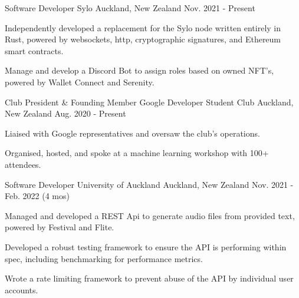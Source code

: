
\begin{cventries}

  \cventry
    {Software Developer} %
    {Sylo} %
    {Auckland, New Zealand} %
    {Nov. 2021 - Present} %
    {
      \begin{cvitems} %
        \item {Independently developed a replacement for the Sylo node written entirely in Rust, powered by websockets, http, cryptographic signatures, and Ethereum smart contracts.}
        \item {Manage and develop a Discord Bot to assign roles based on owned NFT's, powered by Wallet Connect and Serenity.}
      \end{cvitems}
    }

  \cventry
    {Club President \& Founding Member} %
    {Google Developer Student Club} %
    {Auckland, New Zealand} %
    {Aug. 2020 - Present} %
    {
      \begin{cvitems} %
        \item {Liaised with Google representatives and oversaw the club's operations.}
        \item {Organised, hosted, and spoke at a machine learning workshop with 100+ attendees.}
      \end{cvitems}
    }

  \cventry
    {Software Developer} %
    {University of Auckland} %
    {Auckland, New Zealand} %
    {Nov. 2021 - Feb. 2022 (4 mos)} %
    {
      \begin{cvitems} %
        \item {Managed and developed a REST Api to generate audio files from provided text, powered by Festival and Flite.}
        \item {Developed a robust testing framework to ensure the API is performing within spec, including benchmarking for performance metrics.}
        \item {Wrote a rate limiting framework to prevent abuse of the API by individual user accounts.}
      \end{cvitems}
    }



\end{cventries}
